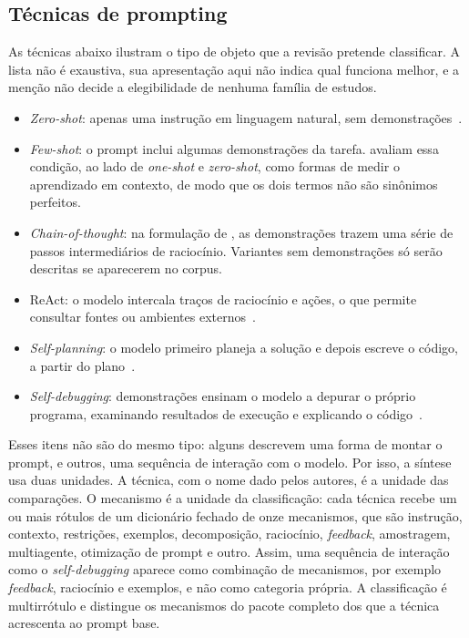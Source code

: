 \subsection{Técnicas de prompting}
As técnicas abaixo ilustram o tipo de objeto que a revisão pretende classificar. A lista não é
exaustiva, sua apresentação aqui não indica qual funciona melhor, e a menção não decide a
elegibilidade de nenhuma família de estudos.
\begin{itemize}
  \item \textit{Zero-shot}: apenas uma instrução em linguagem natural, sem
  demonstrações~\citep{brown2020fewshot}.
  \item \textit{Few-shot}: o prompt inclui algumas demonstrações da tarefa.
   avaliam essa condição, ao lado de \textit{one-shot} e \textit{zero-shot},
  como formas de medir o aprendizado em contexto, de modo que os dois termos não são sinônimos perfeitos.
  \item \textit{Chain-of-thought}: na formulação de , as demonstrações
  trazem uma série de passos intermediários de raciocínio. Variantes sem demonstrações só serão
  descritas se aparecerem no corpus.
  \item ReAct: o modelo intercala traços de raciocínio e ações, o que permite consultar fontes ou
  ambientes externos~\citep{yao2023react}.
  \item \textit{Self-planning}: o modelo primeiro planeja a solução e depois escreve o código,
  a partir do plano~\citep{jiang2025selfplanningv5}.
  \item \textit{Self-debugging}: demonstrações ensinam o modelo a depurar o próprio programa,
  examinando resultados de execução e explicando o código~\citep{chen2023selfdebug}.
\end{itemize}
Esses itens não são do mesmo tipo: alguns descrevem uma forma de montar o prompt, e outros, uma
sequência de interação com o modelo.
Por isso, a síntese usa duas unidades. A técnica, com o nome dado pelos autores, é a unidade das comparações.
O mecanismo é a unidade da classificação: cada técnica recebe um ou mais rótulos de um dicionário fechado de onze
mecanismos, que são instrução, contexto, restrições, exemplos, decomposição, raciocínio, \textit{feedback},
amostragem, multiagente, otimização de prompt e outro. Assim, uma sequência de interação como o
\textit{self-debugging} aparece como combinação de mecanismos, por exemplo \textit{feedback}, raciocínio e
exemplos, e não como categoria própria. A classificação é multirrótulo e distingue os mecanismos do pacote
completo dos que a técnica acrescenta ao prompt base.

